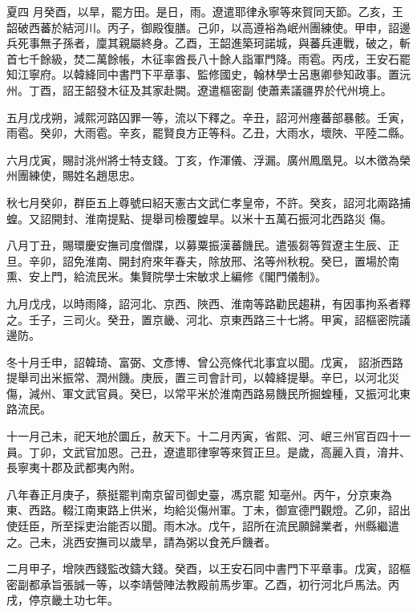 \begin{pinyinscope}
 夏四
 月癸酉，以旱，罷方田。是日，雨。遼遣耶律永寧等來賀同天節。乙亥，王韶破西蕃於結河川。丙子，御殿復膳。己卯，以高遵裕為岷州團練使。甲申，詔邊兵死事無子孫者，廩其親屬終身。乙酉，王韶進築珂諾城，與蕃兵連戰，破之，斬首七千餘級，焚二萬餘帳，木征率酋長八十餘人詣軍門降。雨雹。丙戌，王安石罷知江寧府。以韓絳同中書門下平章事、監修國史，翰林學士呂惠卿參知政事。置沅州。丁酉，詔王韶發木征及其家赴闕。遼遣樞密副
 使蕭素議疆界於代州境上。



 五月戊戌朔，減熙河路囚罪一等，流以下釋之。辛丑，詔河州瘞蕃部暴骸。壬寅，雨雹。癸卯，大雨雹。辛亥，罷賢良方正等科。乙丑，大雨水，壞陜、平陸二縣。



 六月戊寅，賜討洮州將士特支錢。丁亥，作渾儀、浮漏。廣州鳳凰見。以木徵為榮州團練使，賜姓名趙思忠。



 秋七月癸卯，群臣五上尊號曰紹天憲古文武仁孝皇帝，不許。癸亥，詔河北兩路捕蝗。又詔開封、淮南提點、提舉司檢覆蝗旱。以米十五萬石振河北西路災
 傷。



 八月丁丑，賜環慶安撫司度僧牒，以募粟振漢蕃饑民。遣張芻等賀遼主生辰、正旦。辛卯，詔免淮南、開封府來年春夫，除放邢、洺等州秋稅。癸巳，置場於南熏、安上門，給流民米。集賢院學士宋敏求上編修《閣門儀制》。



 九月戊戌，以時雨降，詔河北、京西、陜西、淮南等路勸民趨耕，有因事拘系者釋之。壬子，三司火。癸丑，置京畿、河北、京東西路三十七將。甲寅，詔樞密院議邊防。



 冬十月壬申，詔韓琦、富弼、文彥博、曾公亮條代北事宜以聞。戊寅，
 詔浙西路提舉司出米振常、潤州饑。庚辰，置三司會計司，以韓絳提舉。辛巳，以河北災傷，減州、軍文武官員。癸巳，以常平米於淮南西路易饑民所掘蝗種，又振河北東路流民。



 十一月己未，祀天地於圜丘，赦天下。十二月丙寅，省熙、河、岷三州官百四十一員。丁卯，文武官加恩。己丑，遼遣耶律寧等來賀正旦。是歲，高麗入貢，淯井、長寧夷十郡及武都夷內附。



 八年春正月庚子，蔡挺罷判南京留司御史臺，馮京罷
 知亳州。丙午，分京東為東、西路。輟江南東路上供米，均給災傷州軍。丁未，御宣德門觀燈。乙卯，詔出使廷臣，所至採吏治能否以聞。雨木冰。戊午，詔所在流民願歸業者，州縣繼遣之。己未，洮西安撫司以歲旱，請為粥以食羌戶饑者。



 二月甲子，增陜西錢監改鑄大錢。癸酉，以王安石同中書門下平章事。戊寅，詔樞密副都承旨張誠一等，以李靖營陣法教殿前馬步軍。乙酉，初行河北戶馬法。丙戌，停京畿土功七年。




\end{pinyinscope}
